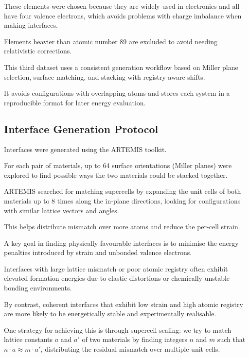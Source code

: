 These elements were chosen because they are widely used in electronics and all have four valence electrons, which avoids
problems with charge imbalance when making interfaces.

Elements heavier than atomic number 89 are excluded to avoid needing relativistic corrections.


This third dataset uses a consistent generation workflow based on Miller plane selection, surface matching, and stacking
with registry-aware shifts.

It avoids configurations with overlapping atoms and stores each system in a reproducible format for later energy
evaluation.


\subsection{Interface Generation Protocol}


Interfaces were generated using the ARTEMIS toolkit.

For each pair of materials, up to 64 surface orientations (Miller planes) were explored to find possible ways the two
materials could be stacked together.

ARTEMIS searched for matching supercells by expanding the unit cells of both materials up to 8 times along the in-plane
directions, looking for configurations with similar lattice vectors and angles.

This helps distribute mismatch over more atoms and reduce the per-cell strain.


A key goal in finding physically favourable interfaces is to minimise the energy penalties introduced by strain and
unbonded valence electrons.

Interfaces with large lattice mismatch or poor atomic registry often exhibit elevated formation energies due to elastic
distortions or chemically unstable bonding environments.

By contrast, coherent interfaces that exhibit low strain and high atomic registry are more likely to be energetically
stable and experimentally realisable.


One strategy for achieving this is through supercell scaling: we try to match lattice constants $a$ and $a'$ of two
materials by finding integers $n$ and $m$ such that $n \cdot a \approx m \cdot a'$, distributing the residual mismatch over multiple
unit cells.

